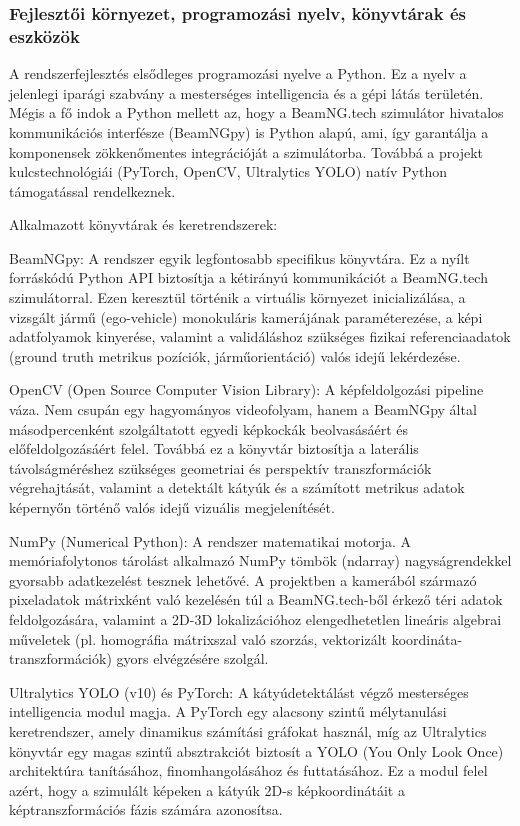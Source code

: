\subsubsection{Fejlesztői környezet, programozási nyelv, könyvtárak és eszközök}

A rendszerfejlesztés elsődleges programozási nyelve a Python. Ez a nyelv a jelenlegi iparági szabvány a mesterséges intelligencia és a gépi látás területén. Mégis a fő indok a Python mellett az, hogy a BeamNG.tech szimulátor hivatalos kommunikációs interfésze (BeamNGpy) is Python alapú, ami, így garantálja a komponensek zökkenőmentes integrációját a szimulátorba. Továbbá a projekt kulcstechnológiái (PyTorch, OpenCV, Ultralytics YOLO) natív Python támogatással rendelkeznek. 

Alkalmazott könyvtárak és keretrendszerek:

BeamNGpy: A rendszer egyik legfontosabb specifikus könyvtára. Ez a nyílt forráskódú Python API biztosítja a kétirányú kommunikációt a BeamNG.tech szimulátorral. Ezen keresztül történik a virtuális környezet inicializálása, a vizsgált jármű (ego-vehicle) monokuláris kamerájának paraméterezése, a képi adatfolyamok kinyerése, valamint a validáláshoz szükséges fizikai referenciaadatok (ground truth metrikus pozíciók, járműorientáció) valós idejű lekérdezése.

OpenCV (Open Source Computer Vision Library): A képfeldolgozási pipeline váza. Nem csupán egy hagyományos videofolyam, hanem a BeamNGpy által másodpercenként szolgáltatott egyedi képkockák beolvasásáért és előfeldolgozásáért felel. Továbbá ez a könyvtár biztosítja a laterális távolságméréshez szükséges geometriai és perspektív transzformációk végrehajtását, valamint a detektált kátyúk és a számított metrikus adatok képernyőn történő valós idejű vizuális megjelenítését.

NumPy (Numerical Python): A rendszer matematikai motorja. A memóriafolytonos tárolást alkalmazó NumPy tömbök (ndarray) nagyságrendekkel gyorsabb adatkezelést tesznek lehetővé. A projektben a kamerából származó pixeladatok mátrixként való kezelésén túl a BeamNG.tech-ből érkező téri adatok feldolgozására, valamint a 2D-3D lokalizációhoz elengedhetetlen lineáris algebrai műveletek (pl. homográfia mátrixszal való szorzás, vektorizált koordináta-transzformációk) gyors elvégzésére szolgál.

Ultralytics YOLO (v10) és PyTorch: A kátyúdetektálást végző mesterséges intelligencia modul magja. A PyTorch egy alacsony szintű mélytanulási keretrendszer, amely dinamikus számítási gráfokat használ, míg az Ultralytics könyvtár egy magas szintű absztrakciót biztosít a YOLO (You Only Look Once) architektúra tanításához, finomhangolásához és futtatásához. Ez a modul felel azért, hogy a szimulált képeken a kátyúk 2D-s képkoordinátáit a képtranszformációs fázis számára azonosítsa.


